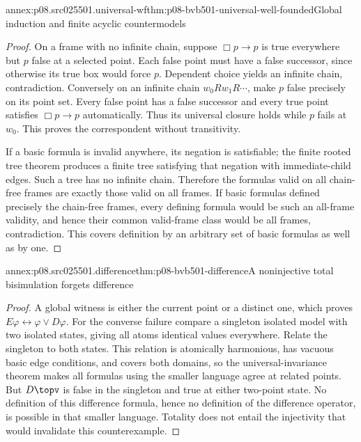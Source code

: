 \begin{annexitem}{annex:p08.src025501.universal-wf}{thm:p08-bvb501-universal-well-founded}{Global induction and finite acyclic countermodels}
\begin{proof}
On a frame with no infinite chain, suppose \(\Box p\to p\)
is true everywhere but \(p\) false at a selected point. Each false
point must have a false successor, since otherwise its true box would
force \(p\). Dependent choice yields an infinite chain, contradiction.
Conversely on an infinite chain \(w_0Rw_1R\cdots\), make
\(p\) false precisely on its point set. Every false point has a
false successor and every true point satisfies \(\Box p\to p\)
automatically. Thus its universal closure holds while \(p\) fails
at \(w_0\). This proves the correspondent without transitivity.

If a basic formula is invalid anywhere, its negation is satisfiable;
the finite rooted tree theorem produces a finite tree satisfying that
negation with immediate-child edges. Such a tree has no infinite
chain. Therefore the formulas valid on all chain-free frames are
exactly those valid on all frames. If basic formulas defined precisely
the chain-free frames, every defining formula would be such an
all-frame validity, and hence their common valid-frame class would
be all frames, contradiction. This covers definition by an arbitrary
set of basic formulas as well as by one.
\end{proof}
\end{annexitem}

\begin{annexitem}{annex:p08.src025501.difference}{thm:p08-bvb501-difference}{A noninjective total bisimulation forgets difference}
\begin{proof}
A global witness is either the current point or a distinct one, which
proves \(E\varphi\leftrightarrow\varphi\lor D\varphi\).
For the converse failure compare a singleton isolated model with two
isolated states, giving all atoms identical values everywhere. Relate
the singleton to both states. This relation is atomically harmonious,
has vacuous basic edge conditions, and covers both domains, so the
universal-invariance theorem makes all formulas using the smaller
language agree at related points. But \(D\topv\) is false in
the singleton and true at either two-point state. No definition of
this difference formula, hence no definition of the difference operator,
is possible in that smaller language. Totality does not entail the
injectivity that would invalidate this counterexample.
\end{proof}
\end{annexitem}

